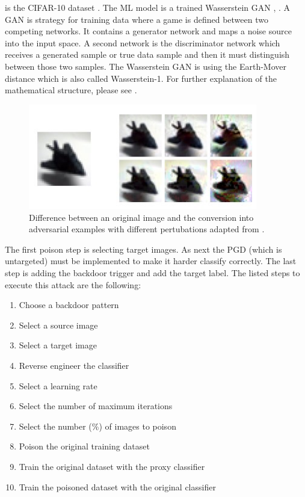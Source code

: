 is the CIFAR-10 dataset \cite{Krizhevsky2009LearningML}. The ML model is a trained Wasserstein GAN \cite{DBLP:journals/corr/ArjovskyCB17}, \cite{DBLP:conf/nips/GulrajaniAADC17}. A GAN is strategy for training data where a game is defined between two competing networks. It contains a generator network and maps a noise source into the input space. A second network is the discriminator network which receives a generated sample or true data sample and then it must distinguish between those two samples. The Wasserstein GAN is using the Earth-Mover distance which is also called Wasserstein-1. For
further explanation of the mathematical structure, please see \cite{DBLP:journals/corr/GulrajaniAADC17}.

\begin{figure}[ht!]
  \centering
  \includegraphics[width=10cm]{pictures/poisoned_clean_label.jpg}
  \caption{Difference between an original image and the conversion into adversarial examples with different pertubations adapted from \cite{turner2018clean}.}
  \label{fig:poisoned_clean_label}
\end{figure}

The first poison step is selecting target images. As next the PGD (which is untargeted)
must be implemented to make it harder classify correctly. The last step is adding the backdoor trigger and add the target label. The listed steps to execute this attack are the following:

\begin{enumerate}
 \item Choose a backdoor pattern
 \item Select a source image
 \item Select a target image
 \item Reverse engineer the classifier
 \item Select a learning rate
 \item Select the number of maximum iterations
 \item Select the number (\%) of images to poison
 \item Poison the original training dataset
 \item Train the original dataset with the proxy classifier
 \item Train the poisoned dataset with the original classifier
\end{enumerate}

